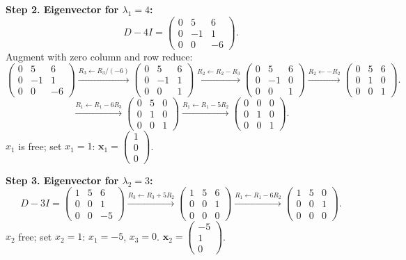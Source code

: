 \documentclass[12pt,a4paper]{article}
\begin{document}
\textbf{Step 2. Eigenvector for $\lambda_1 = 4$:}
\[
  D - 4I = \begin{pmatrix} 0 & 5 & 6 \\ 0 & -1 & 1 \\ 0 & 0 & -6 \end{pmatrix}.
\]
Augment with zero column and row reduce:
\[
  \begin{pmatrix} 0&5&6\\0&-1&1\\0&0&-6 \end{pmatrix}
  \xrightarrow{R_3\leftarrow R_3/(-6)}
  \begin{pmatrix}0&5&6\\0&-1&1\\0&0&1\end{pmatrix}
  \xrightarrow{R_2\leftarrow R_2-R_3}
  \begin{pmatrix}0&5&6\\0&-1&0\\0&0&1\end{pmatrix}
  \xrightarrow{R_2\leftarrow-R_2}
  \begin{pmatrix}0&5&6\\0&1&0\\0&0&1\end{pmatrix}.
\]
\[
  \xrightarrow{R_1\leftarrow R_1-6R_3}
  \begin{pmatrix}0&5&0\\0&1&0\\0&0&1\end{pmatrix}
  \xrightarrow{R_1\leftarrow R_1-5R_2}
  \begin{pmatrix}0&0&0\\0&1&0\\0&0&1\end{pmatrix}.
\]
$x_1$ is free; set $x_1=1$: $\mathbf{x}_1=\begin{pmatrix}1\\0\\0\end{pmatrix}$.

\textbf{Step 3. Eigenvector for $\lambda_2 = 3$:}
\[
  D-3I = \begin{pmatrix}1&5&6\\0&0&1\\0&0&-5\end{pmatrix}
  \xrightarrow{R_3\leftarrow R_3+5R_2}
  \begin{pmatrix}1&5&6\\0&0&1\\0&0&0\end{pmatrix}
  \xrightarrow{R_1\leftarrow R_1-6R_2}
  \begin{pmatrix}1&5&0\\0&0&1\\0&0&0\end{pmatrix}.
\]
$x_2$ free; set $x_2=1$: $x_1=-5$, $x_3=0$. $\mathbf{x}_2=\begin{pmatrix}-5\\1\\0\end{pmatrix}$.
\end{document}

